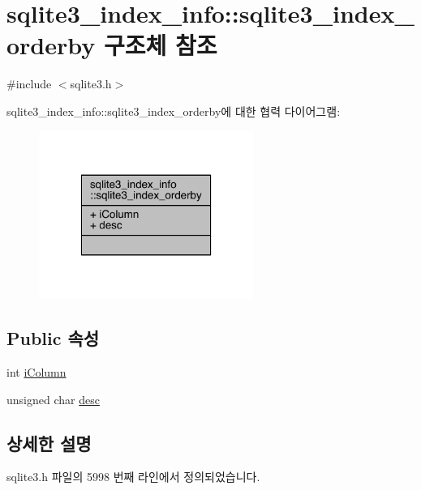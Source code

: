 \hypertarget{structsqlite3__index__info_1_1sqlite3__index__orderby}{}\section{sqlite3\+\_\+index\+\_\+info\+:\+:sqlite3\+\_\+index\+\_\+orderby 구조체 참조}
\label{structsqlite3__index__info_1_1sqlite3__index__orderby}


{\ttfamily \#include $<$sqlite3.\+h$>$}



sqlite3\+\_\+index\+\_\+info\+:\+:sqlite3\+\_\+index\+\_\+orderby에 대한 협력 다이어그램\+:
\nopagebreak
\begin{figure}[H]
\begin{center}
\leavevmode
\includegraphics[width=198pt]{structsqlite3__index__info_1_1sqlite3__index__orderby__coll__graph}
\end{center}
\end{figure}
\subsection*{Public 속성}
\begin{DoxyCompactItemize}
\item 
int \hyperlink{structsqlite3__index__info_1_1sqlite3__index__orderby_a266396085bfda9acef3f13eaa170cd2f}{i\+Column}
\item 
unsigned char \hyperlink{structsqlite3__index__info_1_1sqlite3__index__orderby_a0586d1b5d36221af96aeba8cfc56e9c6}{desc}
\end{DoxyCompactItemize}


\subsection{상세한 설명}


sqlite3.\+h 파일의 5998 번째 라인에서 정의되었습니다.



